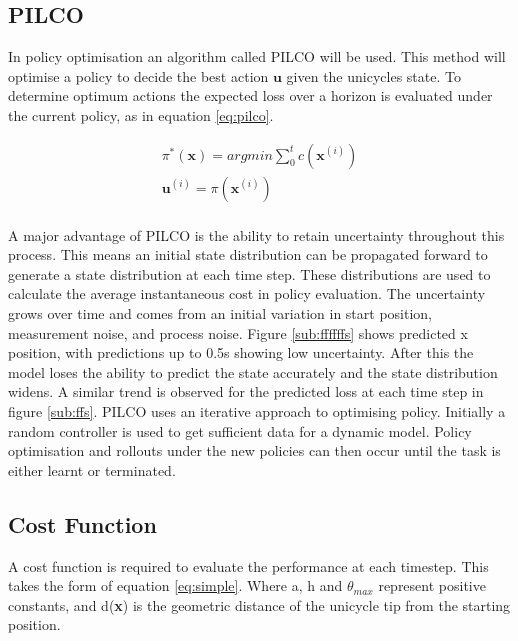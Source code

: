 \documentclass[twoside,twocolumn,12pt]{article}
\begin{document}
\subsection{PILCO}
In policy optimisation an algorithm called PILCO \cite{pilco} will be used.
This method will optimise a policy to decide the best action $\textbf{u}$ given the unicycles state. To determine optimum actions the expected loss over a horizon is evaluated under the current policy, as in equation \ref{eq:pilco}.


\begin{equation}
\begin{split}
\pi^*(\textbf{x}) = argmin \sum_0^tc(\textbf{x}^{(i)}) \\
\textbf{u}^{(i)} = \pi(\textbf{x}^{(i)} )\\
\end{split}
\label{eq:pilco}
\end{equation}




A major advantage of PILCO is the ability to retain uncertainty throughout this process. This means an initial state distribution can be propagated forward to generate a state distribution at each time step. These distributions are used to calculate the average instantaneous cost in policy evaluation.
The uncertainty grows over time and comes from an initial variation in start position, measurement noise, and process noise. 
\newline
Figure \ref{sub:ffffffs} shows predicted x position, with predictions up to 0.5s showing low uncertainty. After this the model loses the ability to predict the state accurately and the state distribution widens. 
A similar trend is observed for the predicted loss at each time step in figure \ref{sub:ffs}.
\newline
PILCO uses an iterative approach to optimising policy. Initially a random controller is used to get sufficient data for a dynamic model. Policy optimisation and rollouts under the new policies can then occur until the task is either learnt or terminated. 


\subsection{Cost Function}
A cost function is required to evaluate the performance at each timestep. This takes the form of equation \ref{eq:simple}. Where a, h and $\theta_{max}$ represent positive constants, and d(\textbf{x}) is the geometric distance of the unicycle tip from the starting position.
\end{document}
